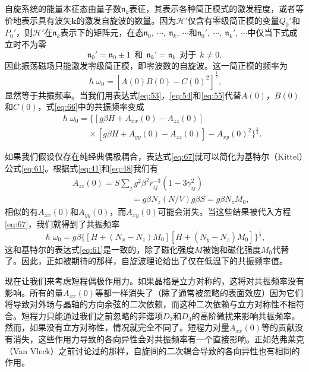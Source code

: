 \documentclass{article}
\begin{document}
自旋系统的能量本征态由量子数$\mathfrak{n}_k$表征，其表示各种简正模式的激发程度，或者等价地表示具有波矢$\mathbf{k}$的激发自旋波的数量。因为$\mathcal{H}'$仅含有零级简正模的变量$Q_0'$和$P_0'$，则$\mathcal{H}'$在$\mathfrak{n}_k$表示下的矩阵元，在态$\mathfrak{n}_0,~\cdots,~\mathfrak{n}_k,~\cdots$和$\mathfrak{n}_0',~\cdots,~\mathfrak{n}_k',~\cdots$中仅当下式成立时不为零
\begin{equation} \label{eq:65}
\mathfrak{n}_0'=\mathfrak{n}_0\pm 1~~\text{和}~~\mathfrak{n}_k'=\mathfrak{n}_k~~\text{对于}~~k\neq 0.
\end{equation}
因此振荡磁场只能激发零级简正模，即零波数的自旋波。这一简正模的频率为
\begin{equation} \label{eq:66}
\hslash\omega_0=[A(0)B(0)-C(0)^2]^{\frac{1}{2}},
\end{equation}
显然等于共振频率。当我们用表达式\eqref{eq:53}，\eqref{eq:54}和\eqref{eq:55}代替$A(0)$，$B(0)$和$C(0)$，式\eqref{eq:66}中的共振频率变成
\begin{eqnarray} \label{eq:67}
&&\hslash\omega_0=\{[g\beta H+A_{xx}(0)-A_{zz}(0)]\nonumber\\
&&\phantom{~~~~~~~~~~~~~~~}\times[g\beta H+A_{yy}(0)-A_{zz}(0)]-A_{xy}(0)^2\}^{\frac{1}{2}}.
\end{eqnarray}

如果我们假设仅存在纯经典偶极耦合，表达式\eqref{eq:67}就可以简化为基特尔（Kittel）公式\eqref{eq:61}。根据式\eqref{eq:41}和\eqref{eq:48}我们有
\begin{eqnarray} \label{eq:68}
&&A_{zz}(0)=S\sum\nolimits_jg^2\beta^2r_{ij}^{-3}(1-3\gamma_{ij}^2)\nonumber\\
&&\phantom{~~~~~~~~~~~~~~~~~~~~~~~~~~~~~~~~}=g\beta N_z(N/V)g\beta S=g\beta N_zM_0,
\end{eqnarray}
相似的有$A_{xx}(0)$和$A_{yy}(0)$，而$A_{xy}(0)$可能会消失。当这些结果被代入方程\eqref{eq:67}，我们就得到了共振频率
\begin{equation} \label{eq:69}
\hslash\omega_0=g\beta\{[H+(N_x-N_z)M_0][H+(N_y-N_z)M_0]\}^{\frac{1}{2}},
\end{equation}
这和基特尔的表达式\eqref{eq:61}是一致的，除了磁化强度$M$被饱和磁化强度$M_0$代替了。因此，正如被期待的那样，自旋波理论给出了仅在低温下的共振频率值。

现在让我们来考虑短程偶极作用力。如果晶格是立方对称的，这将对共振频率没有影响。所有的量$A_{xx}(0)$等都一样消失了（除了通常被忽略的表面效应）因为它们将导致对外场与晶轴的方向余弦的二次依赖，而这种二次依赖与立方对称性不相符合。短程力只能通过我们之前忽略的非谐项$D_3$和$D_4$的高阶微扰来影响共振频率。然而，如果没有立方对称性，情况就完全不同了。短程力对量$A_{xx}(0)$等的贡献没有消失，这些作用力导致的各向异性会对共振频率有一个直接影响。正如范弗莱克（Van Vleck）之前讨论过的那样，自旋间的二次耦合导致的各向异性也有相同的作用。
\end{document}
